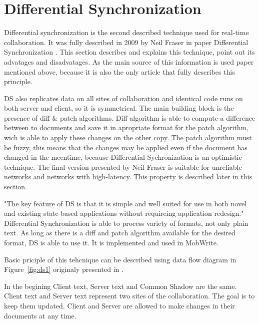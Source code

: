 \documentclass[12pt,oneside]{fithesis2}
\begin{document}
\section{Differential Synchronization}
\par Differential synchronization is the second described technique used for real-time collaboration. It was fully described in 2009 by Neil Fraser in paper Differential Synchronization \cite{Fraser}. This section describes and explains this technique, point out its advatages and disadvatages. As the main source of this information is used paper mentioned above, because it is also the only article that fully describes this principle.
\par DS also replicates data on all sites of collaboration and identical code runs on both server and client, so it is symmetrical. The main building block is the presence of diff \& patch algorithms. Diff algorithm is able to compute a difference between to documents and save it in apropriate format for the patch algorithm, wich is able to apply these changes on the other copy. The patch algorithm must be fuzzy, this means that the changes may be applied even if the document has changed in the meentime, because Differential Sychronization is an optimistic technique. The final version presented by Neil Fraser is suitable for unreliable networks and networks with high-latency. This property is described later in this section.
\par "The key feature of DS is that it is simple and well suited for use in both novel and existing state-based applications without requireing application redesign." \cite{Fraser} Differential Synchronization is able to process variety of formats, not only plain text. As long as there is a diff and patch algorithm available for the desired format, DS is able to use it. It is implemented and used in MobWrite. 
\par Basic priciple of this tehcnique can be described using data flow diagram in Figure~\ref{fig:ds1} originaly presented in \cite{Fraser}.  
\par In the begining Client text, Server text and Common Shadow are the same. Client text and Server text represent two sites of the collaboration. The goal is to keep them updated. Client and Server are allowed to make changes in their documents at any time. 
\end{document}
